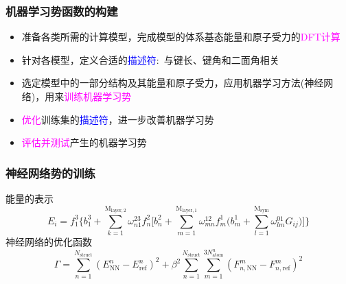 \begin{frame}
	\frametitle{机器学习势函数的构建}
	\begin{itemize}
		\item 准备各类所需的计算模型，完成模型的体系基态能量和原子受力的\textcolor{magenta}{\textrm{DFT}计算}
		\item 针对各模型，定义合适的\textcolor{blue}{描述符}:~与键长、键角和二面角相关
			{\fontsize{6.2pt}{4.2pt}}
		\item 选定模型中的一部分结构及其能量和原子受力，应用机器学习方法(神经网络)，用来\textcolor{magenta}{训练机器学习势}
		\item \textcolor{magenta}{优化}训练集的\textcolor{blue}{描述符}，进一步改善机器学习势
		\item \textcolor{magenta}{评估并测试}产生的机器学习势
	\end{itemize}
\end{frame}
	
\begin{frame}
	\frametitle{神经网络势的训练}
	能量的表示
	\begin{displaymath}
		E_i=f_1^3\bigg\{b_1^3+\sum_{k=1}^{\mathrm{M}_{\mathrm{layer},2}}\omega_{n1}^{23}f_n^2\bigg[b_n^2+\sum_{m=1}^{\mathrm{M}_{\mathrm{layer},1}}\omega_{mn}^{12}f_m^1\bigg(b_m^1+\sum_{l=1}^{\mathrm{M}_{\mathrm{sym}}}\omega_{lm}^{01}G_{ij}\bigg)\bigg]\bigg\}
	\end{displaymath}
神经网络的优化函数
\begin{displaymath}
	\Gamma=\sum_{n=1}^{N_{\mathrm{struct}}}(E_{\mathrm{NN}}^n-E_{\mathrm{ref}}^n)^2+\beta^2\sum_{n=1}^{N_{\mathrm{struct}}}\sum_{m=1}^{3N_{\mathrm{atom}}^n}(F_{n,\mathrm{NN}}^m-F_{n,\mathrm{ref}}^m)^2
\end{displaymath}
\end{frame}

